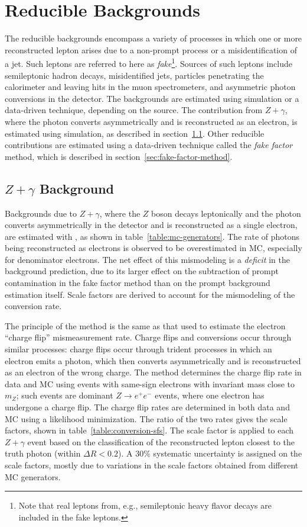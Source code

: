 \section{Reducible Backgrounds}\label{sec:reducible-backgrounds}
The reducible backgrounds encompass a variety of processes in which one or more reconstructed lepton arises due to a non-prompt process or a misidentification of a jet. Such leptons are referred to here as \emph{fake}\footnote{Note that real leptons from, e.g., semileptonic heavy flavor decays are included in the fake leptons.}. Sources of such leptons include semileptonic hadron decays, misidentified jets, particles penetrating the calorimeter and leaving hits in the muon spectrometers, and asymmetric photon conversions in the detector. The backgrounds are estimated using simulation or a data-driven technique, depending on the source. The contribution from $Z+\gamma$, where the photon converts asymmetrically and is reconstructed as an electron, is estimated using simulation, as described in section~\ref{sec:backgrounds-zgamma}. Other reducible contributions are estimated using a data-driven technique called the \emph{fake factor} method, which is described in section~\ref{sec:fake-factor-method}. 

\subsection{$Z+\gamma$ Background}\label{sec:backgrounds-zgamma}
Backgrounds due to $Z+\gamma$, where the $Z$ boson decays leptonically and the photon converts asymmetrically in the detector and is reconstructed as a single electron, are estimated with \sherpa, as shown in table~\ref{table:mc-generators}. The rate of photons being reconstructed as electrons is observed to be overestimated in MC, especially for denominator electrons. The net effect of this mismodeling is a \emph{deficit} in the background prediction, due to its larger effect on the subtraction of prompt contamination in the fake factor method than on the prompt background estimation itself. Scale factors are derived to account for the mismodeling of the conversion rate. 

The principle of the method is the same as that used to estimate the electron ``charge flip'' mismeasurement rate. Charge flips and conversions occur through similar processes: charge flips occur through trident processes in which an electron emits a photon, which then converts asymmetrically and is reconstructed as an electron of the wrong charge. The method determines the charge flip rate in data and MC using events with same-sign electrons with invariant mass close to $m_Z$; such events are dominant $Z\rightarrow e^+e^-$ events, where one electron has undergone a charge flip. The charge flip rates are determined in both data and MC using a likelihood minimization. The ratio of the two rates gives the scale factors, shown in table~\ref{table:conversion-sfs}. The scale factor is applied to each $Z+\gamma$ event based on the classification of the reconstructed lepton closest to the truth photon (within $\Delta R<0.2$). A $30\%$ systematic uncertainty is assigned on the scale factors, mostly due to variations in the scale factors obtained from different MC generators. 

